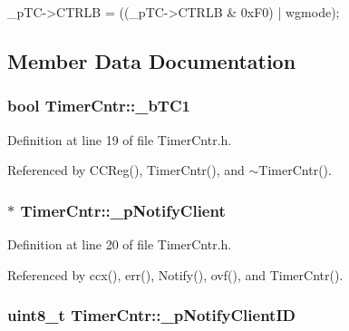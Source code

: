 \begin{DoxyCode}
{
    _pTC->CTRLB = ((_pTC->CTRLB & 0xF0) | wgmode);
}
\end{DoxyCode}


\subsection{Member Data Documentation}
\hypertarget{class_timer_cntr_a568c634a1b85c88206408c5108500c7b}{
\subsubsection[{\_\-bTC1}]{\setlength{\rightskip}{0pt plus 5cm}bool {\bf TimerCntr::\_\-bTC1}}}
\label{class_timer_cntr_a568c634a1b85c88206408c5108500c7b}


Definition at line 19 of file TimerCntr.h.



Referenced by CCReg(), TimerCntr(), and $\sim$TimerCntr().

\hypertarget{class_timer_cntr_ab0667571f2dab6ca9f759d9b2c8ce59f}{
\subsubsection[{\_\-pNotifyClient}]{$\ast$ {\bf TimerCntr::\_\-pNotifyClient}}}
\label{class_timer_cntr_ab0667571f2dab6ca9f759d9b2c8ce59f}


Definition at line 20 of file TimerCntr.h.



Referenced by ccx(), err(), Notify(), ovf(), and TimerCntr().

\hypertarget{class_timer_cntr_a98b954b9492a11842e511fa21d0131cc}{
\subsubsection[{\_\-pNotifyClientID}]{\setlength{\rightskip}{0pt plus 5cm}uint8\_\-t {\bf TimerCntr::\_\-pNotifyClientID}}}
\label{class_timer_cntr_a98b954b9492a11842e511fa21d0131cc}


